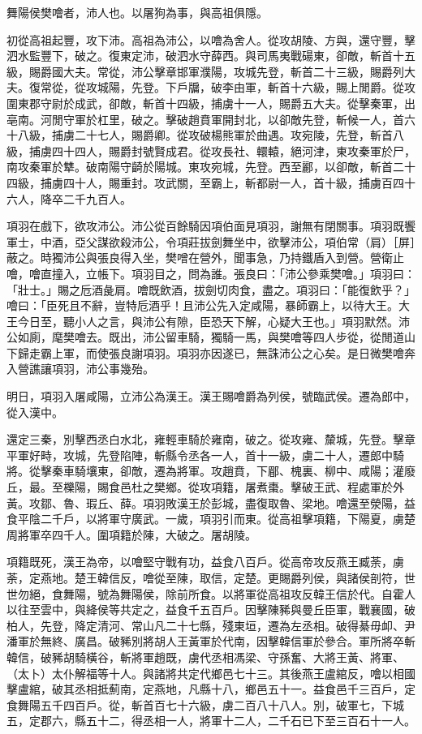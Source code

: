 
\begin{pinyinscope}
舞陽侯樊噲者，沛人也。以屠狗為事，與高祖俱隱。

初從高祖起豐，攻下沛。高祖為沛公，以噲為舍人。從攻胡陵、方與，還守豐，擊泗水監豐下，破之。復東定沛，破泗水守薛西。與司馬夷戰碭東，卻敵，斬首十五級，賜爵國大夫。常從，沛公擊章邯軍濮陽，攻城先登，斬首二十三級，賜爵列大夫。復常從，從攻城陽，先登。下戶牖，破李由軍，斬首十六級，賜上閒爵。從攻圍東郡守尉於成武，卻敵，斬首十四級，捕虜十一人，賜爵五大夫。從擊秦軍，出亳南。河閒守軍於杠里，破之。擊破趙賁軍開封北，以卻敵先登，斬候一人，首六十八級，捕虜二十七人，賜爵卿。從攻破楊熊軍於曲遇。攻宛陵，先登，斬首八級，捕虜四十四人，賜爵封號賢成君。從攻長社、轘轅，絕河津，東攻秦軍於尸，南攻秦軍於犨。破南陽守齮於陽城。東攻宛城，先登。西至酈，以卻敵，斬首二十四級，捕虜四十人，賜重封。攻武關，至霸上，斬都尉一人，首十級，捕虜百四十六人，降卒二千九百人。

項羽在戲下，欲攻沛公。沛公從百餘騎因項伯面見項羽，謝無有閉關事。項羽既饗軍士，中酒，亞父謀欲殺沛公，令項莊拔劍舞坐中，欲擊沛公，項伯常（肩）［屏］蔽之。時獨沛公與張良得入坐，樊噌在營外，聞事急，乃持鐵盾入到營。營衛止噲，噲直撞入，立帳下。項羽目之，問為誰。張良曰：「沛公參乘樊噲。」項羽曰：「壯士。」賜之卮酒彘肩。噲既飲酒，拔劍切肉食，盡之。項羽曰：「能復飲乎？」噲曰：「臣死且不辭，豈特卮酒乎！且沛公先入定咸陽，暴師霸上，以待大王。大王今日至，聽小人之言，與沛公有隙，臣恐天下解，心疑大王也。」項羽默然。沛公如廁，麾樊噲去。既出，沛公留車騎，獨騎一馬，與樊噲等四人步從，從閒道山下歸走霸上軍，而使張良謝項羽。項羽亦因遂已，無誅沛公之心矣。是日微樊噲奔入營譙讓項羽，沛公事幾殆。

明日，項羽入屠咸陽，立沛公為漢王。漢王賜噲爵為列侯，號臨武侯。遷為郎中，從入漢中。

還定三秦，別擊西丞白水北，雍輕車騎於雍南，破之。從攻雍、斄城，先登。擊章平軍好畤，攻城，先登陷陣，斬縣令丞各一人，首十一級，虜二十人，遷郎中騎將。從擊秦車騎壤東，卻敵，遷為將軍。攻趙賁，下郿、槐裏、柳中、咸陽；灌廢丘，最。至櫟陽，賜食邑杜之樊鄉。從攻項籍，屠煮棗。擊破王武、程處軍於外黃。攻鄒、魯、瑕丘、薛。項羽敗漢王於彭城，盡復取魯、梁地。噲還至滎陽，益食平陰二千戶，以將軍守廣武。一歲，項羽引而東。從高祖擊項籍，下陽夏，虜楚周將軍卒四千人。圍項籍於陳，大破之。屠胡陵。

項籍既死，漢王為帝，以噲堅守戰有功，益食八百戶。從高帝攻反燕王臧荼，虜荼，定燕地。楚王韓信反，噲從至陳，取信，定楚。更賜爵列侯，與諸侯剖符，世世勿絕，食舞陽，號為舞陽侯，除前所食。以將軍從高祖攻反韓王信於代。自霍人以往至雲中，與絳侯等共定之，益食千五百戶。因擊陳豨與曼丘臣軍，戰襄國，破柏人，先登，降定清河、常山凡二十七縣，殘東垣，遷為左丞相。破得綦毋卹、尹潘軍於無終、廣昌。破豨別將胡人王黃軍於代南，因擊韓信軍於參合。軍所將卒斬韓信，破豨胡騎橫谷，斬將軍趙既，虜代丞相馮梁、守孫奮、大將王黃、將軍、（太卜）太仆解福等十人。與諸將共定代鄉邑七十三。其後燕王盧綰反，噲以相國擊盧綰，破其丞相抵薊南，定燕地，凡縣十八，鄉邑五十一。益食邑千三百戶，定食舞陽五千四百戶。從，斬首百七十六級，虜二百八十八人。別，破軍七，下城五，定郡六，縣五十二，得丞相一人，將軍十二人，二千石已下至三百石十一人。


\end{pinyinscope}
